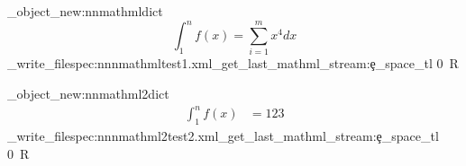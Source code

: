 \documentclass{article}
\begin{document}
\ExplSyntaxOn
\pdf_object_new:nn{mathml}{dict}
\ExplSyntaxOff
{}
\[
  \int_1^n f(x) = \sum_{i=1}^m x^4 dx
\]
\ExplSyntaxOn
\edef\blub{\luamml_get_last_mathml_stream:e{}\c_space_tl 0~R}
\pdffile_write_filespec:nnn{mathml}{test1.xml}{\blub}
\tagmcend
\tagstructend
\ExplSyntaxOff

\ExplSyntaxOn
\pdf_object_new:nn{mathml2}{dict}
\ExplSyntaxOff
{}
\begin{align}
  \int_1^n f(x) &= 123
\end{align}
\ExplSyntaxOn
\edef\blub{\luamml_get_last_mathml_stream:e{}\c_space_tl 0~R}
\pdffile_write_filespec:nnn{mathml2}{test2.xml}{\blub}

\ExplSyntaxOff


\tagmcend
\tagstructend


\tagstructend
\end{document}
